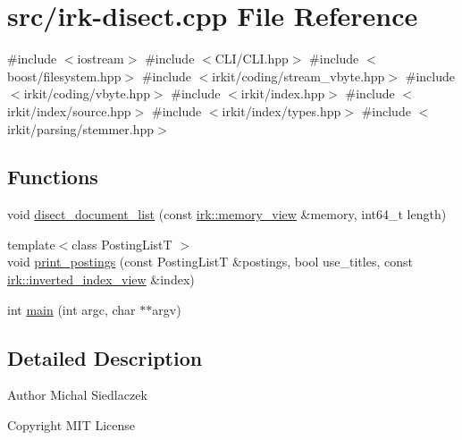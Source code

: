 \hypertarget{irk-disect_8cpp}{}\section{src/irk-\/disect.cpp File Reference}
\label{irk-disect_8cpp}
{\ttfamily \#include $<$iostream$>$}\newline
{\ttfamily \#include $<$C\+L\+I/\+C\+L\+I.\+hpp$>$}\newline
{\ttfamily \#include $<$boost/filesystem.\+hpp$>$}\newline
{\ttfamily \#include $<$irkit/coding/stream\+\_\+vbyte.\+hpp$>$}\newline
{\ttfamily \#include $<$irkit/coding/vbyte.\+hpp$>$}\newline
{\ttfamily \#include $<$irkit/index.\+hpp$>$}\newline
{\ttfamily \#include $<$irkit/index/source.\+hpp$>$}\newline
{\ttfamily \#include $<$irkit/index/types.\+hpp$>$}\newline
{\ttfamily \#include $<$irkit/parsing/stemmer.\+hpp$>$}\newline
\subsection*{Functions}
\begin{DoxyCompactItemize}
\item 
void \mbox{\hyperlink{irk-disect_8cpp_ae8eeb2d378d264ff5b1ec465055629a4}{disect\+\_\+document\+\_\+list}} (const \mbox{\hyperlink{classirk_1_1memory__view}{irk\+::memory\+\_\+view}} \&memory, int64\+\_\+t length)
\item 
{\footnotesize template$<$class Posting\+ListT $>$ }\\void \mbox{\hyperlink{irk-disect_8cpp_a8fd168baf0349318b98384a15e1ed018}{print\+\_\+postings}} (const Posting\+ListT \&postings, bool use\+\_\+titles, const \mbox{\hyperlink{namespaceirk_a137711df98ba695c3526ba4004853a47}{irk\+::inverted\+\_\+index\+\_\+view}} \&index)
\item 
int \mbox{\hyperlink{irk-disect_8cpp_a3c04138a5bfe5d72780bb7e82a18e627}{main}} (int argc, char $\ast$$\ast$argv)
\end{DoxyCompactItemize}


\subsection{Detailed Description}
\begin{DoxyAuthor}{Author}
Michal Siedlaczek 
\end{DoxyAuthor}
\begin{DoxyCopyright}{Copyright}
M\+IT License 
\end{DoxyCopyright}


